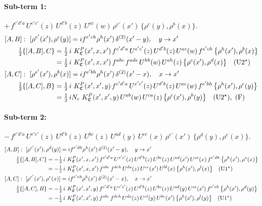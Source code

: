 \documentclass[10pt]{article}
\numberwithin{equation}{section}
\begin{document}
\paragraph{Sub-term 1:} $+\,f^{c'd'a}\,U^{e'c'}(z)\,U^{d'b}(z)\,U^{ac}(w)\,\rho^{e'}(x')\,\big\{\rho^{c}(y),\rho^{b}(x)\big\}$.
\begin{align}
&[A,B]:\ [\rho^{e'}(x'),\rho^{c}(y)]=i f^{e'ch}\rho^{h}(x')\,\delta^{(2)}(x'-y),\quad y\to x'\notag\\
&\qquad \tfrac12\{[A,B],C\}=\tfrac12\,i\,\,K^{P}_{\mathfrak C}(x',x,x')\,f^{c'd'a}\,U^{e'c'}(z)\,U^{d'b}(z)\,U^{ac}(w)\,f^{e'ch}\,\big\{\rho^{h}(x'),\rho^{b}(x)\big\}\notag\\
&\qquad\phantom{\tfrac12\{[A,B],C\}}=\tfrac12\,i\,\,K^{P}_{\mathfrak C}(x',x,x')\,f^{abc}\,f^{ade}\,U^{hb}(w)\,U^{eh}(z)\,\big\{\rho^{c}(x'),\rho^{d}(x)\big\}\quad\text{(U2$^\star$)}
\label{eq:GIII.III.P-1-AB}\\
&[A,C]:\ [\rho^{e'}(x'),\rho^{b}(x)]=i f^{e'bh}\rho^{h}(x')\,\delta^{(2)}(x'-x),\quad x\to x'\notag\\
&\qquad \tfrac12\{[A,C],B\}=\tfrac12\,i\,\,K^{P}_{\mathfrak C}(x',x',y)\,f^{c'd'a}\,U^{e'c'}(z)\,U^{d'b}(z)\,U^{ac}(w)\,f^{e'bh}\,\big\{\rho^{h}(x'),\rho^{c}(y)\big\}\notag\\
&\qquad\phantom{\tfrac12\{[A,C],B\}}=\tfrac12\,i N_{c}\,\,K^{P}_{\mathfrak C}(x',x',y)\,U^{ab}(w)\,U^{ca}(z)\,\big\{\rho^{c}(x'),\rho^{b}(y)\big\}\quad\text{(U2$^\star$)},\ \text{(F)}
\label{eq:GIII.III.P-1-AC}
\end{align}
\paragraph{Sub-term 2:} $-\,f^{c'd'a}\,U^{e'c'}(z)\,U^{d'b}(z)\,U^{bc}(z)\,U^{ad}(y)\,U^{ce}(x)\,\rho^{e'}(x')\,\big\{\rho^{d}(y),\rho^{e}(x)\big\}$.
\begin{align}
&[A,B]:\ [\rho^{e'}(x'),\rho^{d}(y)]=i f^{e'dh}\rho^{h}(x')\,\delta^{(2)}(x'-y),\quad y\to x'\notag\\
&\qquad \tfrac12\{[A,B],C\}=-\tfrac12\,i\,\,K^{P}_{\mathfrak C}(x',x,x')\,f^{c'd'a}\,U^{e'c'}(z)\,U^{d'b}(z)\,U^{bc}(z)\,U^{ad}(x')\,U^{ce}(x)\,f^{e'dh}\,\big\{\rho^{h}(x'),\rho^{e}(x)\big\}\notag\\
&\qquad\phantom{\tfrac12\{[A,B],C\}}=-\tfrac12\,i\,\,K^{P}_{\mathfrak C}(x',x,x')\,f^{abc}\,f^{deh}\,U^{da}(z)\,U^{ce}(x')\,U^{bl}(x)\,\big\{\rho^{h}(x'),\rho^{l}(x)\big\}\quad\text{(U1$^\star$)}
\label{eq:GIII.III.P-2-AB}\\
&[A,C]:\ [\rho^{e'}(x'),\rho^{e}(x)]=i f^{e'eh}\rho^{h}(x')\,\delta^{(2)}(x'-x),\quad x\to x'\notag\\
&\qquad \tfrac12\{[A,C],B\}=-\tfrac12\,i\,\,K^{P}_{\mathfrak C}(x',x',y)\,f^{c'd'a}\,U^{e'c'}(z)\,U^{d'b}(z)\,U^{bc}(z)\,U^{ad}(y)\,U^{ce}(x')\,f^{e'eh}\,\big\{\rho^{h}(x'),\rho^{d}(y)\big\}\notag\\
&\qquad\phantom{\tfrac12\{[A,C],B\}}=-\tfrac12\,i\,\,K^{P}_{\mathfrak C}(x',x',y)\,f^{abc}\,f^{deh}\,U^{da}(z)\,U^{cl}(y)\,U^{be}(x')\,\big\{\rho^{h}(x'),\rho^{l}(y)\big\}\quad\text{(U1$^\star$)}
\label{eq:GIII.III.P-2-AC}
\end{align}
\end{document}
